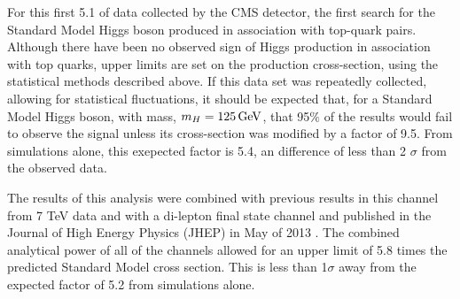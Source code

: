\par  For this first 5.1 \fbinv of data collected by the CMS detector,
the first search for the Standard Model Higgs boson produced in
association with top-quark pairs.  Although there have been no
observed sign of Higgs production in association with top quarks,
upper limits are set on the production cross-section,  using the
statistical methods  described above.  If this data set was repeatedly
collected, allowing for statistical fluctuations, it should be
expected that, for a Standard Model Higgs boson, with mass, $m_{H} =
125 \,\text{Ge\hspace{-.08em}V}$, that 95$\%$ of the results would fail to observe the \ttH
signal unless its cross-section was modified by a factor of 9.5.  From
simulations alone, this exepected factor is 5.4, an difference of less
than 2 $\sigma$ from the observed data.    

\par The results of this analysis were combined with previous results
in this channel from 7 TeV data and with a di-lepton final state
channel and published in the Journal of High Energy Physics (JHEP) in
May of 2013 \cite{Chatrchyan:2013yea}.  The combined analytical power
of all of the channels allowed for an upper limit of 5.8 times
the predicted Standard Model cross section.  This is less than
1$\sigma$ away from the expected factor of 5.2 from simulations
alone.  